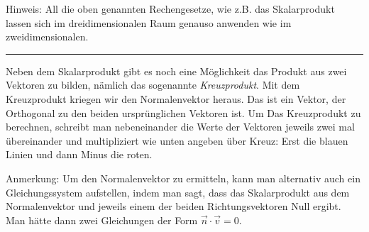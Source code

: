 \documentclass[12pt]{article}
\begin{document}
			Hinweis: All die oben genannten Rechengesetze, wie z.B. das Skalarprodukt lassen sich im dreidimensionalen Raum genauso anwenden wie im zweidimensionalen.
			\vspace{.5cm}\hrule\vspace{.7cm}
			\noindent Neben dem Skalarprodukt gibt es noch eine Möglichkeit das Produkt aus zwei Vektoren zu bilden, nämlich das sogenannte \textit{Kreuzprodukt}. Mit dem Kreuzprodukt kriegen wir den Normalenvektor heraus. Das ist ein Vektor, der Orthogonal zu den beiden ursprünglichen Vektoren ist. Um Das Kreuzprodukt zu berechnen, schreibt man nebeneinander die Werte der Vektoren jeweils zwei mal übereinander und multipliziert wie unten angeben über Kreuz: Erst die blauen Linien und dann Minus die roten.
			\begin{center}
			\end{center}
			Anmerkung: Um den Normalenvektor zu ermitteln, kann man alternativ auch ein Gleichungssystem aufstellen, indem man sagt, dass das Skalarprodukt aus dem Normalenvektor und jeweils einem der beiden Richtungsvektoren Null ergibt. Man hätte dann zwei Gleichungen der Form $\vec{n}\cdot\vec{v}=0$.
\end{document}
